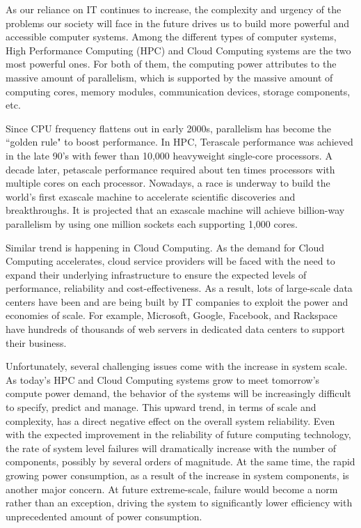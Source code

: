 As our reliance on IT continues to increase, the complexity and urgency of the problems our society will face 
in the future drives us to build more powerful and accessible computer systems. Among the different types of 
computer systems, High Performance Computing (HPC) and Cloud Computing systems are the two most powerful ones. 
For both of them, the computing power attributes to the massive amount of parallelism, which is supported by 
the massive amount of computing cores, memory modules, communication devices, storage components, etc. 

Since CPU frequency flattens out in early 2000s, parallelism has become the ``golden rule" to boost performance. 
In HPC, Terascale performance was achieved in the late 90’s with fewer than 10,000 heavyweight single-core processors. 
A decade later, petascale performance required about ten times processors with multiple cores on each processor. Nowadays, a race
is underway to build the world's first exascale machine to accelerate scientific discoveries and breakthroughs. It is 
projected that an exascale machine will achieve billion-way parallelism by using one million sockets each supporting 
1,000 cores. 

Similar trend is happening in Cloud Computing. 
As the demand for Cloud Computing accelerates, cloud service providers  
will be faced with the need to expand their underlying infrastructure to ensure the expected levels of performance, reliability and cost-effectiveness. 
As a result, lots of large-scale data centers have been and are being built by IT companies
to exploit the power and economies of scale. 
For example, Microsoft, Google, Facebook, and Rackspace have hundreds of thousands 
of web servers in dedicated data centers to support their business. 

Unfortunately, several challenging issues come with the increase in system scale. As today's HPC and Cloud Computing systems grow to 
meet tomorrow's compute power demand, the behavior of the systems will be increasingly difficult to specify, predict and manage. 
This upward trend, in terms of scale and complexity, has a direct negative effect on the overall system reliability. 
Even with the expected improvement in the reliability of future computing technology, the rate of system level failures will 
dramatically increase with the number of components, possibly by several orders of magnitude. 
At the same time, the rapid 
growing power consumption, as a result of the increase in system components, is another major concern. 
At future extreme-scale, failure would become a norm rather than an exception, 
driving the system to significantly lower efficiency with unprecedented amount of power consumption. 

